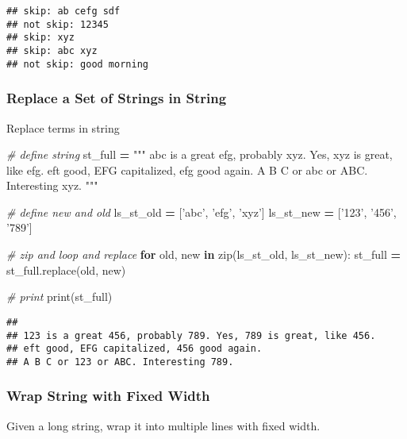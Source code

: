 \documentclass[
]{book}
\newenvironment{Shaded}{\begin{snugshade}}{\end{snugshade}}
\newcommand{\BuiltInTok}[1]{#1}
\newcommand{\CommentTok}[1]{\textcolor[rgb]{0.56,0.35,0.01}{\textit{#1}}}
\newcommand{\ControlFlowTok}[1]{\textcolor[rgb]{0.13,0.29,0.53}{\textbf{#1}}}
\newcommand{\KeywordTok}[1]{\textcolor[rgb]{0.13,0.29,0.53}{\textbf{#1}}}
\newcommand{\NormalTok}[1]{#1}
\newcommand{\OperatorTok}[1]{\textcolor[rgb]{0.81,0.36,0.00}{\textbf{#1}}}
\newcommand{\StringTok}[1]{\textcolor[rgb]{0.31,0.60,0.02}{#1}}
\begin{document}
\begin{verbatim}
## skip: ab cefg sdf
## not skip: 12345
## skip: xyz
## skip: abc xyz
## not skip: good morning
\end{verbatim}

\hypertarget{replace-a-set-of-strings-in-string}{%
\subsubsection{Replace a Set of Strings in String}\label{replace-a-set-of-strings-in-string}}

Replace terms in string

\begin{Shaded}
\begin{Highlighting}[]
\CommentTok{# define string}
\NormalTok{st_full }\OperatorTok{=} \StringTok{"""}
\StringTok{abc is a great efg, probably xyz. Yes, xyz is great, like efg. }
\StringTok{eft good, EFG capitalized, efg good again. }
\StringTok{A B C or abc or ABC. Interesting xyz. }
\StringTok{"""}

\CommentTok{# define new and old}
\NormalTok{ls_st_old }\OperatorTok{=}\NormalTok{ [}\StringTok{'abc'}\NormalTok{, }\StringTok{'efg'}\NormalTok{, }\StringTok{'xyz'}\NormalTok{]}
\NormalTok{ls_st_new }\OperatorTok{=}\NormalTok{ [}\StringTok{'123'}\NormalTok{, }\StringTok{'456'}\NormalTok{, }\StringTok{'789'}\NormalTok{]}

\CommentTok{# zip and loop and replace}
\ControlFlowTok{for}\NormalTok{ old, new }\KeywordTok{in} \BuiltInTok{zip}\NormalTok{(ls_st_old, ls_st_new):}
\NormalTok{  st_full }\OperatorTok{=}\NormalTok{ st_full.replace(old, new)}

\CommentTok{# print}
\BuiltInTok{print}\NormalTok{(st_full)}
\end{Highlighting}
\end{Shaded}

\begin{verbatim}
## 
## 123 is a great 456, probably 789. Yes, 789 is great, like 456. 
## eft good, EFG capitalized, 456 good again. 
## A B C or 123 or ABC. Interesting 789.
\end{verbatim}

\hypertarget{wrap-string-with-fixed-width}{%
\subsubsection{Wrap String with Fixed Width}\label{wrap-string-with-fixed-width}}

Given a long string, wrap it into multiple lines with fixed width.
\end{document}
